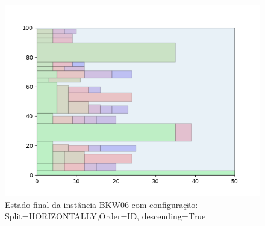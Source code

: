 \begin{figure}[H]
    \centering
    \caption[]{Estado final da instância BKW06 com configuração: Split=HORIZONTALLY,Order=ID, descending=True}
    \label{fig:bkw06-horizontally-id-true}
    \includegraphics[scale=0.5]{output/figures/bkw/bkw06/horizontally/id/true/00}
\end{figure}